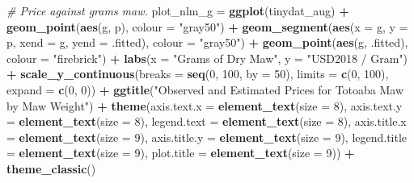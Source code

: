 \documentclass[]{article}
\newenvironment{Shaded}{\begin{snugshade}}{\end{snugshade}}
\newcommand{\KeywordTok}[1]{\textcolor[rgb]{0.13,0.29,0.53}{\textbf{#1}}}
\newcommand{\DataTypeTok}[1]{\textcolor[rgb]{0.13,0.29,0.53}{#1}}
\newcommand{\DecValTok}[1]{\textcolor[rgb]{0.00,0.00,0.81}{#1}}
\newcommand{\StringTok}[1]{\textcolor[rgb]{0.31,0.60,0.02}{#1}}
\newcommand{\CommentTok}[1]{\textcolor[rgb]{0.56,0.35,0.01}{\textit{#1}}}
\newcommand{\OperatorTok}[1]{\textcolor[rgb]{0.81,0.36,0.00}{\textbf{#1}}}
\newcommand{\NormalTok}[1]{#1}
\begin{document}
\begin{Shaded}
\begin{Highlighting}[]
\CommentTok{# Price against grams maw.}
\NormalTok{plot_nlm_g =}
\StringTok{  }\KeywordTok{ggplot}\NormalTok{(tinydat_aug) }\OperatorTok{+}
\StringTok{  }\KeywordTok{geom_point}\NormalTok{(}\KeywordTok{aes}\NormalTok{(g, p), }\DataTypeTok{colour =} \StringTok{"gray50"}\NormalTok{) }\OperatorTok{+}
\StringTok{  }\KeywordTok{geom_segment}\NormalTok{(}\KeywordTok{aes}\NormalTok{(}\DataTypeTok{x =}\NormalTok{ g, }\DataTypeTok{y =}\NormalTok{ p, }\DataTypeTok{xend =}\NormalTok{ g, }\DataTypeTok{yend =}\NormalTok{ .fitted), }\DataTypeTok{colour =} \StringTok{"gray50"}\NormalTok{) }\OperatorTok{+}
\StringTok{  }\KeywordTok{geom_point}\NormalTok{(}\KeywordTok{aes}\NormalTok{(g, .fitted), }\DataTypeTok{colour =} \StringTok{"firebrick"}\NormalTok{) }\OperatorTok{+}
\StringTok{  }\KeywordTok{labs}\NormalTok{(}\DataTypeTok{x =} \StringTok{"Grams of Dry Maw"}\NormalTok{, }\DataTypeTok{y =} \StringTok{"USD2018 / Gram"}\NormalTok{) }\OperatorTok{+}
\StringTok{  }\KeywordTok{scale_y_continuous}\NormalTok{(}\DataTypeTok{breaks =} \KeywordTok{seq}\NormalTok{(}\DecValTok{0}\NormalTok{, }\DecValTok{100}\NormalTok{, }\DataTypeTok{by =} \DecValTok{50}\NormalTok{), }\DataTypeTok{limits =} \KeywordTok{c}\NormalTok{(}\DecValTok{0}\NormalTok{, }\DecValTok{100}\NormalTok{), }\DataTypeTok{expand =} \KeywordTok{c}\NormalTok{(}\DecValTok{0}\NormalTok{, }\DecValTok{0}\NormalTok{)) }\OperatorTok{+}
\StringTok{  }\KeywordTok{ggtitle}\NormalTok{(}\StringTok{"Observed and Estimated Prices for Totoaba Maw by Maw Weight"}\NormalTok{) }\OperatorTok{+}
\StringTok{  }\KeywordTok{theme}\NormalTok{(}\DataTypeTok{axis.text.x =} \KeywordTok{element_text}\NormalTok{(}\DataTypeTok{size =} \DecValTok{8}\NormalTok{),}
        \DataTypeTok{axis.text.y =} \KeywordTok{element_text}\NormalTok{(}\DataTypeTok{size =} \DecValTok{8}\NormalTok{),}
        \DataTypeTok{legend.text =} \KeywordTok{element_text}\NormalTok{(}\DataTypeTok{size =} \DecValTok{8}\NormalTok{),}
        \DataTypeTok{axis.title.x =} \KeywordTok{element_text}\NormalTok{(}\DataTypeTok{size =} \DecValTok{9}\NormalTok{),}
        \DataTypeTok{axis.title.y =} \KeywordTok{element_text}\NormalTok{(}\DataTypeTok{size =} \DecValTok{9}\NormalTok{),}
        \DataTypeTok{legend.title =} \KeywordTok{element_text}\NormalTok{(}\DataTypeTok{size =} \DecValTok{9}\NormalTok{),}
        \DataTypeTok{plot.title =} \KeywordTok{element_text}\NormalTok{(}\DataTypeTok{size =} \DecValTok{9}\NormalTok{)) }\OperatorTok{+}
\StringTok{  }\KeywordTok{theme_classic}\NormalTok{()}


\end{Highlighting}
\end{Shaded}
\end{document}

